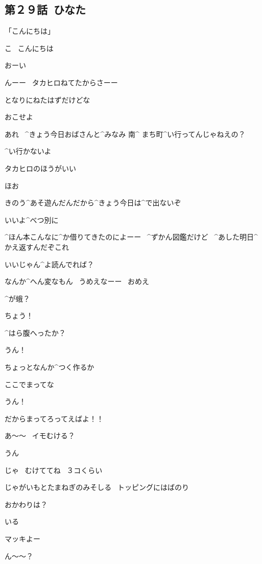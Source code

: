\subsection{第２９話\ ひなた}

\page[80]
\Kokone 「こんにちは」

\Takahiro こ
\ こんにちは

\Alpha おーい

\page[82]
\Makki んーー
\ タカヒロねてたからさーー

\Makki となりにねたはずだけどな

\Takahiro おこせよ

\page
\Takahiro あれ
\ ^{きょう}{今日}おばさんと^{みなみ }{南}^{ まち}{町}^{い}{行}ってんじゃねえの？

\Makki ^{い}{行}かないよ

\Makki タカヒロのほうがいい

\Takahiro ほお

\Takahiro きのう^{あそ}{遊}んだんだから^{きょう}{今日}は^{で}{出}ないぞ

\Makki いいよ^{べつ}{別}に

\Makki ^{ほん}{本}こんなに^{か}{借}りてきたのによーー
\ ^{ずかん}{図鑑}だけど
\ ^{あした}{明日}^{かえ}{返}すんだぞこれ

\Takahiro いいじゃん^{よ}{読}んでれば？

\page
\Takahiro なんか^{へん}{変}なもん
\ うめえなーー
\ おめえ

\Takahiro ^{が}{蛾}？

\Makki ちょう！

\page
\Takahiro ^{はら}{腹}へったか？

\Makki うん！

\Takahiro ちょっとなんか^{つく}{作}るか

\Takahiro ここでまってな

\Makki うん！

\page
\Takahiro だからまってろってえばよ！！

\Takahiro あ〜〜
\ イモむける？

\Makki うん

\Takahiro じゃ
\ むけててね
\ ３コくらい

\page
\Narrator じゃがいもとたまねぎのみそしる
\ トッピングにはばのり

\Takahiro おかわりは？

\Makki いる

\page
\Takahiro マッキよー

\Makki ん〜〜？


